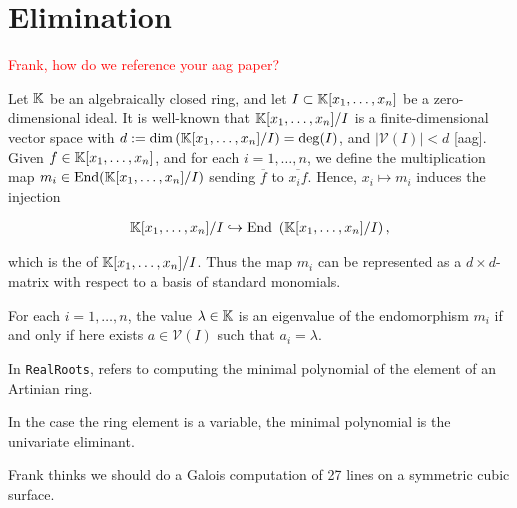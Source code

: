 


\section{Elimination}


\textcolor{red}{Frank, how do we reference your aag paper?}

Let $\mathbb{K}$ be an algebraically closed ring, and let $I\subset \mathbb{K}[x_{1},\dots,x_{n}]$ be a zero-dimensional ideal. It is well-known that $\mathbb{K}[x_{1},\dots,x_{n}]/I$ is a finite-dimensional vector space with $d:=\text{dim}\left( \mathbb{K}[x_{1},
\dots, x_{n}]/I \right) = \deg(I)$, and $|\mathcal{V}(I)|< d$ [aag]. Given $f\in \mathbb{K}[x_{1},\dots, x_{n}]$, and for each $i=1,\dots,n$, we define the multiplication map $m_{i}\in \text{End} (\mathbb{K}[x_{1},\dots, x_{n}]/I)$ sending $\overline{f}$ to $\overline{x_{i}f}$. Hence, $x_{i}\mapsto m_{i}$ induces the injection

\begin{align*}\mathbb{K}[x_{1},\dots,x_{n}]/I \hookrightarrow \text{End }\left(\mathbb{K}[x_{1},\dots, x_{n}]/I \right), \end{align*}

which is the  of $\mathbb{K}[x_{1},\dots,x_{n}]/I$. Thus the map $m_{i}$ can be represented as a $d\times d$-matrix with respect to a basis of standard monomials.

\begin{theorem} For each $i=1,\dots, n$, the value $\lambda \in \mathbb{K}$ is an eigenvalue of the endomorphism $m_{i}$ if and only if here exists $a\in \mathcal{V}(I)$ such that $a_{i}=\lambda$.
\end{theorem}

In \texttt{RealRoots},  refers to computing the minimal polynomial of the element of an Artinian ring.
%
\begin{leftbar}

\end{leftbar}
% 

In the case the ring element is a variable, the minimal polynomial is the univariate eliminant.
%
\begin{leftbar}

\end{leftbar}
%





%



{\color{red} Frank thinks we should do a Galois computation of 27 lines on a symmetric cubic surface.}

